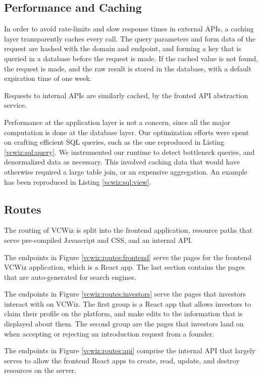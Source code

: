 \subsection{Performance and Caching}

In order to avoid rate-limits and slow response times in external APIs, a caching layer transparently caches every call. The query parameters and form data of the request are hashed with the domain and endpoint, and forming a key that is queried in a database before the request is made. If the cached value is not found, the request is made, and the raw result is stored in the database, with a default expiration time of one week.

Requests to internal APIs are similarly cached, by the fronted API abstraction service.

Performance at the application layer is not a concern, since all the major computation is done at the database layer. Our optimization efforts were spent on crafting efficient SQL queries, such as the one reproduced in Listing \ref{vcwiz:sql:query}. We instrumented our runtime to detect bottleneck queries, and denormalized data as necessary. This involved caching data that would have otherwise required a large table join, or an expensive aggregation. An example has been reproduced in Listing \ref{vcwiz:sql:view}.

\subsection{Routes}

The routing of VCWiz is split into the frontend application, resource paths that serve pre-compiled Javascript and CSS, and an internal API.

The endpoints in Figure \ref{vcwiz:routes:frontend} serve the pages for the frontend VCWiz application, which is a React app. The last section contains the pages that are auto-generated for search engines.

The endpoints in Figure \ref{vcwiz:routes:investors} serve the pages that investors interact with on VCWiz. The first group is a React app that allows investors to claim their profile on the platform, and make edits to the information that is displayed about them. The second group are the pages that investors land on when accepting or rejecting an introduction request from a founder.

The endpoints in Figure \ref{vcwiz:routes:api} comprise the internal API that largely serves to allow the frontend React apps to create, read, update, and destroy resources on the server.

